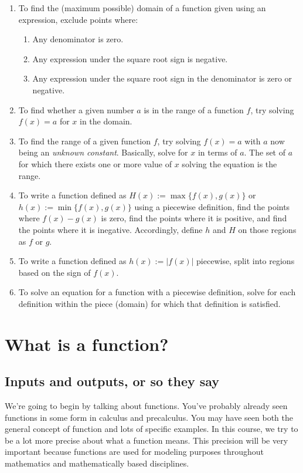 \documentclass{amsart}
\begin{document}
\begin{enumerate}
\item To find the (maximum possible) domain of a function given using
  an expression, exclude points where:
  
  \begin{enumerate}
  \item Any denominator is zero.
  \item Any expression under the square root sign is negative.
  \item Any expression under the square root sign in the denominator is
    zero or negative.
  \end{enumerate}

\item To find whether a given number $a$ is in the range of a function
  $f$, try solving $f(x) = a$ for $x$ in the domain.
\item To find the range of a given function $f$, try solving $f(x) =
  a$ with $a$ now being an {\em unknown constant}. Basically, solve
  for $x$ in terms of $a$. The set of $a$ for which there exists one
  or more value of $x$ solving the equation is the range.
\item To write a function defined as $H(x) := \max \{ f(x), g(x) \}$
  or $h(x) := \min\{ f(x), g(x) \}$ using a piecewise definition, find
  the points where $f(x) - g(x)$ is zero, find the points where it is
  positive, and find the points where it is inegative. Accordingly,
  define $h$ and $H$ on those regions as $f$ or $g$.
\item To write a function defined as $h(x) := |f(x)|$ piecewise, split
  into regions based on the sign of $f(x)$.
\item To solve an equation for a function with a piecewise definition,
  solve for each definition within the piece (domain) for which that
  definition is satisfied.
\end{enumerate}

\section{What is a function?}\label{whatisafunction}

\subsection{Inputs and outputs, or so they say}

We're going to begin by talking about functions. You've probably
already seen functions in some form in calculus and precalculus. You
may have seen both the general concept of function and lots of
specific examples. In this course, we try to be a lot more precise
about what a function means. This precision will be very important
because functions are used for modeling purposes throughout
mathematics and mathematically based disciplines.
\end{document}
